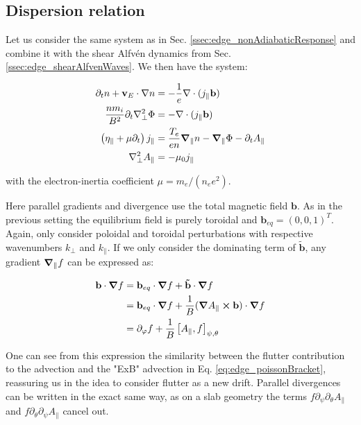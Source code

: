 \subsection{Dispersion relation}

Let us consider the same system as in Sec. \ref{ssec:edge_nonAdiabaticResponse} and combine it with the shear Alfvén dynamics from Sec. \ref{ssec:edge_shearAlfvenWaves}. We then have the system: 

\begin{align}
	\partial_t n + \mathbf{v}_E\cdot\nabla n &= -\frac{1}{e}\nabla\cdot(j_\parallel \mathbf{b}) \\
	\frac{nm_i}{B^2}\partial_t\nabla_\perp^2\Phi &= -\nabla\cdot(j_\parallel \mathbf{b}) \\
	\left(\eta_\parallel + \mu\partial_t \right) j_\parallel &= \frac{T_e}{en}\grad_\parallel n - \grad_\parallel \Phi - \partial_t A_\parallel \\
	\nabla_\perp^2 A_\parallel &= -\mu_0 j_\parallel
\end{align}

with the electron-inertia coefficient $\mu = m_e / (n_ee^2)$. 

Here parallel gradients and divergence use the total magnetic field $\mathbf{b}$. As in the previous setting the equilibrium field is purely toroidal and $\mathbf{b}_{eq} = (0,0,1)^T$. Again, only consider poloidal and toroidal perturbations with respective wavenumbers $k_\perp$ and $k_\parallel$. If we only consider the dominating term of $\mathbf{\tilde{b}}$, any gradient $\grad_\parallel f$ can be expressed as:

\begin{align}
	\mathbf{b}\cdot\grad f &= \mathbf{b}_{eq}\cdot\grad f + \mathbf{\tilde{b}} \cdot \grad f \nonumber\\
	&= \mathbf{b}_{eq}\cdot\grad f + \frac{1}{B}(\grad A_\parallel \cross \mathbf{b})\cdot\grad f \nonumber\\ 
	&= \partial_\varphi f + \frac{1}{B}\left[A_\parallel,f\right]_{\psi,\theta}
\end{align}

One can see from this expression the similarity between the flutter contribution to the advection and the "ExB" advection in Eq. \ref{eq:edge_poissonBracket}, reassuring us in the idea to consider flutter as a new drift. Parallel divergences can be written in the exact same way, as on a slab geometry the terms $f\partial_\psi\partial_\theta A_\parallel$ and $f\partial_\theta\partial_\psi A_\parallel$ cancel out.

